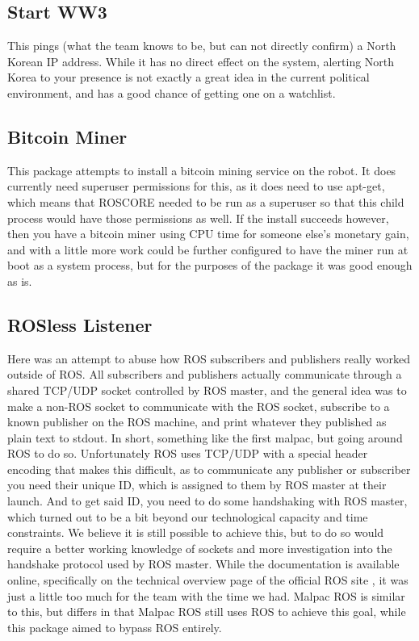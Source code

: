 \documentclass[IEEEtran,letterpaper,10pt,notitlepage,draftclsnofoot]{article}
\begin{document}
\subsection{Start WW3}
This pings (what the team knows to be, but can not directly confirm) a North Korean IP address.
While it has no direct effect on the system, alerting North Korea to your presence is not exactly a great idea in the current political environment, and has a good chance of getting one on a watchlist.

\subsection{Bitcoin Miner}
This package attempts to install a bitcoin mining service on the robot.
It does currently need superuser permissions for this, as it does need to use apt-get, which means that ROSCORE
needed to be run as a superuser so that this child process would have those permissions as well.
If the install succeeds however, then you have a bitcoin miner using CPU time for someone else’s monetary gain, and with a
little more work could be further configured to have the miner run at boot as a system process, but for the purposes of the
package it was good enough as is.

\subsection{ROSless Listener}
Here was an attempt to abuse how ROS subscribers and publishers really worked outside of ROS.
All subscribers and publishers actually communicate through a shared TCP/UDP socket controlled by ROS master, and the general
idea was to make a non-ROS socket to communicate with the ROS socket, subscribe to a known publisher on the ROS machine, and
print whatever they published as plain text to stdout.
In short, something like the first malpac, but going around ROS to do so. Unfortunately ROS uses TCP/UDP with a special header encoding that makes this difficult, as to communicate any publisher or subscriber you need their unique ID, which is assigned to them by ROS master at their launch. And to get said ID, you need to do some handshaking with ROS master, which turned out to be a bit beyond our technological capacity and time constraints.
We believe it is still possible to achieve this, but to do so would require a better working knowledge of sockets and more
investigation into the handshake protocol used by ROS master.
While the documentation is available online, specifically on the technical overview page of the official ROS site \cite{ROS}, it was just a little too much for the team with the time we had. Malpac ROS is similar to this, but differs in that Malpac ROS
still uses ROS to achieve this goal, while this package aimed to bypass ROS entirely.
\end{document}
